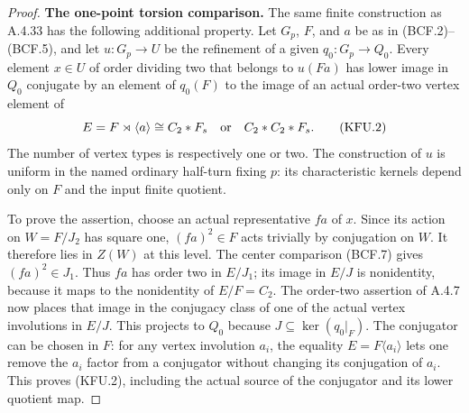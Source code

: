 \begin{proof}
\par\medskip\noindent\textbf{The one-point torsion comparison.}\quad
The same finite construction as A.4.33 has the following
additional property.  Let $G_p$, $F$, and $a$ be as in
(BCF.2)--(BCF.5), and let $u:G_p\to U$ be the refinement
of a given $q_0:G_p\to Q_0$.  Every element $x\in U$
of order dividing two that belongs to $u(Fa)$ has lower
image in $Q_0$ conjugate by an element of $q_0(F)$ to
the image of an actual order-two vertex element of
\[
 E=F\rtimes\langle a\rangle
       \cong C_2*F_s\quad\hbox{or}\quad C_2*C_2*F_s.
                                                               \tag{KFU.2}
\]
The number of vertex types is respectively one or two.
The construction of $u$ is uniform in the named ordinary
half-turn fixing $p$: its characteristic kernels depend
only on $F$ and the input finite quotient.

To prove the assertion, choose an actual representative
$fa$ of $x$.  Since its action on $W=F/J_2$ has square
one, $(fa)^2\in F$ acts trivially by conjugation on $W$.
It therefore lies in $Z(W)$ at this level.  The center
comparison (BCF.7) gives $(fa)^2\in J_1$.
Thus $fa$ has order two in $E/J_1$; its image in $E/J$
is nonidentity, because it maps to the nonidentity of
$E/F=C_2$.  The order-two assertion of A.4.7 now places
that image in the conjugacy class of one of the actual
vertex involutions in $E/J$.  This projects to $Q_0$
because $J\subseteq\ker(q_0|_F)$.
The conjugator can be chosen in $F$: for any vertex
involution $a_i$, the equality $E=F\langle a_i\rangle$
lets one remove the $a_i$ factor from a conjugator
without changing its conjugation of $a_i$.
This proves (KFU.2), including the actual source of
the conjugator and its lower quotient map.


\end{proof}
